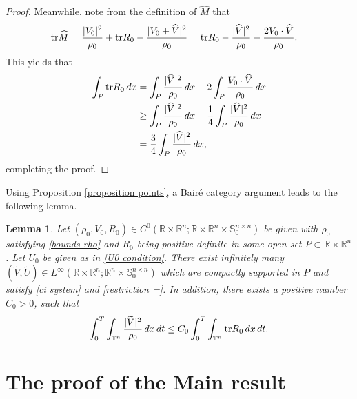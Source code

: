 \documentclass[12pt,reqno]{amsart}
\newtheorem{Lemma}{Lemma}[section]
\theoremstyle{definition}
\theoremstyle{remark}
\numberwithin{equation}{section}
\newcommand{\R}{{\mathbb R}}
\newcommand{\tr}{{\rm tr}}
\begin{document}
\begin{proof}
Meanwhile, note from the definition of $\widehat{M}$ that 
  \begin{equation*}
  \begin{split}
  \tr \widehat{M}&=\frac{|V_0|^2}{\rho_0} + \tr R_0-\frac{|V_0+\widehat{V}|^2}{\rho_0}
  = \tr R_0-\frac{|\widehat{V}|^2}{\rho_0}-\frac{2V_0\cdot \widehat{V}}{\rho_0}.
  \end{split}
  \end{equation*}  
  This yields that
  \begin{equation*}
  \begin{split}
  \int_P\tr R_0\,dx&=\int_P\frac{|\widehat{V}|^2}{\rho_0}\,dx+2\int_P\frac{V_0\cdot\widehat{V}}{\rho_0}\,dx
  \\&\geq \int_P\frac{|\widehat{V}|^2}{\rho_0}\,dx-\frac{1}{4}\int_P\frac{|\widehat{V}|^2}{\rho_0}\,dx
  \\&=\frac{3}{4}\int_P\frac{|\widehat{V}|^2}{\rho_0}\,dx,
  \end{split}
  \end{equation*}
completing the proof.   
\end{proof}

Using Proposition \ref{proposition points}, a Bair\'e category argument leads to the following lemma.
\begin{Lemma}\label{lem conv int}
Let $(\rho_0, V_0, R_0) \in C^0(\R \times \R^n; \R \times \R^n \times \mathbb{S}_0^{n\times n})$
 be given with $\rho_0$ satisfying  \eqref{bounds rho}  and $R_0$ being positive definite in some open set $P \subset \R \times \R^n$. Let $U_0$ be given as in \eqref{U0 condition}. There exist infinitely many $(\widetilde{V},\widetilde{U}) \in L^\infty(\R \times \R^n; \R^n \times  \mathbb{S}_0^{n\times n})$ which are compactly supported in $P$ and satisfy \eqref{ci system} and \eqref{restriction =}. In addition, there exists a positive number $C_0>0$, such that 
 $$\int_0^T\int_{\mathbb{T}^n}\frac{|\widetilde{V}|^2}{\rho_0}\,dx\,dt\leq C_0\int_0^T\int_{\mathbb{T}^n} \tr R_0\,dx\,dt.$$
\end{Lemma}


\bigskip

\section{The proof of the Main result}\label{sec pf}
\end{document}
